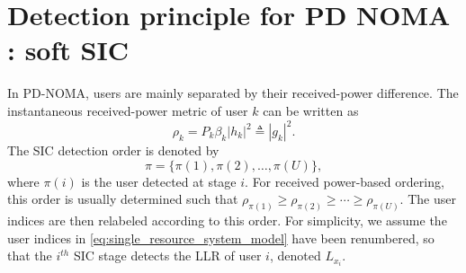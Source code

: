 \section{Detection principle for PD NOMA : soft SIC}
\label{sec:Detection principle for PD NOMA : soft SIC}
In PD-NOMA, users are mainly separated by their received-power difference. The instantaneous received-power metric of user $k$ can be written as
\begin{equation}
    \rho_k = P_k\beta_k |h_k|^2 \triangleq |g_k|^2.
\end{equation}
The SIC detection order is denoted by
\begin{equation}
    \pi=\{\pi(1),\pi(2),\ldots,\pi(U)\},
\end{equation}
where $\pi(i)$ is the user detected at stage $i$. For received power-based ordering, this order is usually determined such that
    $\rho_{\pi(1)} \geq \rho_{\pi(2)} \geq \cdots \geq \rho_{\pi(U)}$.
The user indices are then relabeled according to this order.
For simplicity, we assume the user indices in \eqref{eq:single_resource_system_model} have been renumbered, so that the $i^{th}$ SIC stage detects the LLR of user $i$, denoted $L_{x_i}$.

